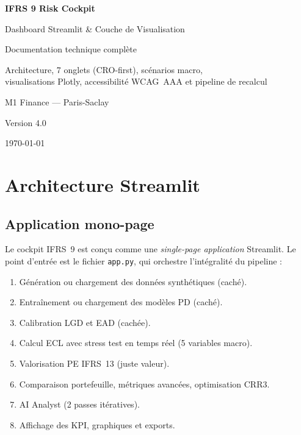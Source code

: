 \documentclass[12pt,a4paper]{article}
\begin{document}
\begin{titlepage}
\centering
\vspace*{3cm}
{\Huge\bfseries\color{darkblue} IFRS 9 Risk Cockpit\par}
\vspace{0.5cm}
{\LARGE\color{steelblue} Dashboard Streamlit \& Couche de Visualisation\par}
\vspace{1.5cm}
{\large Documentation technique compl\`ete\par}
\vspace{0.5cm}
{\large Architecture, 7 onglets (CRO-first), sc\'enarios macro,\\ visualisations Plotly, accessibilit\'e WCAG~AAA et pipeline de recalcul\par}
\vspace{2cm}
{\large\color{gray} M1 Finance --- Paris-Saclay\par}
\vspace{0.5cm}
{\large\color{gray} Version 4.0\par}
\vfill
{\small\color{gray} \today}
\end{titlepage}

\tableofcontents
\newpage

\section{Architecture Streamlit}
\label{sec:architecture}

\subsection{Application mono-page}

Le cockpit IFRS~9 est con\c{c}u comme une \emph{single-page application} Streamlit. Le point d'entr\'ee est le fichier \texttt{app.py}, qui orchestre l'int\'egralit\'e du pipeline :

\begin{enumerate}[leftmargin=2em]
    \item G\'en\'eration ou chargement des donn\'ees synth\'etiques (cach\'e).
    \item Entra\^{i}nement ou chargement des mod\`eles PD (cach\'e).
    \item Calibration LGD et EAD (cach\'ee).
    \item Calcul ECL avec stress test en temps r\'eel (5 variables macro).
    \item Valorisation PE IFRS~13 (juste valeur).
    \item Comparaison portefeuille, m\'etriques avanc\'ees, optimisation CRR3.
    \item AI Analyst (2 passes it\'eratives).
    \item Affichage des KPI, graphiques et exports.
\end{enumerate}
\end{document}
